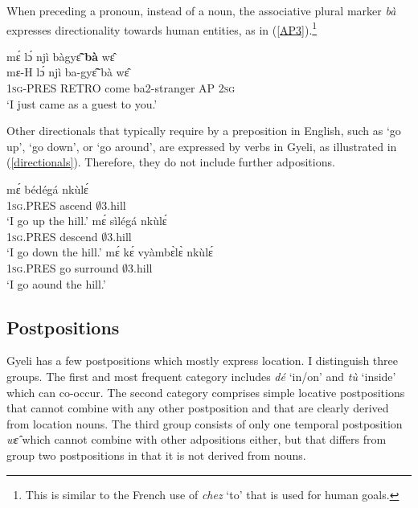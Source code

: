 When preceding a pronoun, instead of a noun, the associative plural marker {\itshape bà} expresses directionality towards human entities, as in (\ref{AP3}).\footnote{This is similar to the French use of {\itshape chez} `to' that is used for human goals.}

\begin{exe} 
\ex\label{AP3}
  \glll mɛ́ lɔ́ njì bàgyɛ̃̂ {\bfseries bà} wɛ̂ \\
       mɛ-H lɔ́ njì ba-gyɛ̃̂ bà wɛ̂ \\
       1\textsc{sg}-PRES RETRO come ba2-stranger AP 2\textsc{sg}  \\
    \trans `I just came as a guest to you.'
\end{exe}


Other directionals that  typically require by a preposition  in English, such as `go up', `go down', or `go around', are expressed by verbs in Gyeli, as illustrated in (\ref{directionals}). Therefore, they do not include further adpositions. 

\begin{exe}
\ex\label{directionals}
\begin{xlist}
\ex\label{directionals1}
  \gll    mɛ́ bédégá nkùlɛ́\\
              1\textsc{sg}.PRES ascend $\emptyset$3.hill \\
    \trans `I go up the hill.'
\ex\label{directionals2}
  \gll    mɛ́ sìlégá nkùlɛ́\\
              1\textsc{sg}.PRES descend $\emptyset$3.hill \\
    \trans `I go down the hill.'
\ex\label{directionals3}
  \gll    mɛ́ kɛ́ vyàmbɛ̀lɛ̀ nkùlɛ́\\
              1\textsc{sg}.PRES go surround $\emptyset$3.hill \\
    \trans `I go aound the hill.'
\end{xlist}
\end {exe}










\subsection{Postpositions} 
\label{sec:POST}

Gyeli has a few postpositions which mostly express location. I distinguish three groups. The first and most frequent category includes {\itshape dé} `in/on' and {\itshape tù} `inside' which can co-occur. The second category comprises simple locative postpositions that cannot combine with any other postposition and that are clearly derived from location nouns. The third group consists of only one temporal postposition {\itshape wɛ̂} which cannot combine with other adpositions either, but that differs from group two postpositions in that it is not derived from nouns.




